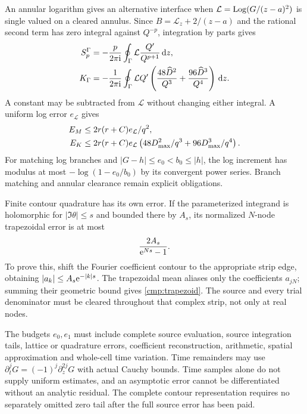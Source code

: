 An annular logarithm gives an alternative interface when
$\mathcal L=\operatorname{Log}(G/(z-a)^2)$ is single valued on a cleared annulus.
Since $B=\mathcal L_z+2/(z-a)$ and the rational second term has zero
integral against $Q^{-p}$, integration by parts gives
\begin{align}
 S_p^\Gamma&=-\frac{p}{2\pi\mathrm i}\oint_\Gamma
                  \mathcal L\frac{Q'}{Q^{p+1}}\,\mathrm d z,\notag\\
 K_\Gamma&=-\frac1{2\pi\mathrm i}\oint_\Gamma\mathcal L Q'
              \left(\frac{48\widehat D^2}{Q^3}
                    +\frac{96\widehat D^3}{Q^4}\right)\,\mathrm d z.
 \label{cmp:log-kernel}
\end{align}
A constant may be subtracted from $\mathcal L$ without changing either
integral. A uniform log error $e_{\mathcal L}$ gives
\begin{align}
 E_M&\le 2r(r+C)e_{\mathcal L}/q^2,\notag\\
 E_K&\le 2r(r+C)e_{\mathcal L}
        \left(48D_{\max}^2/q^3+96D_{\max}^3/q^4\right).
 \label{cmp:log-errors}
\end{align}
For matching log branches and $|G-h|\le e_0<b_0\le|h|$, the log increment
has modulus at most $-\log(1-e_0/b_0)$ by its convergent power series.
Branch matching and annular clearance remain explicit obligations.

Finite contour quadrature has its own error. If the parameterized
integrand is holomorphic for $|\Im\theta|\le s$ and bounded there by
$A_s$, its normalized $N$-node trapezoidal error is at most
\begin{equation}
 \frac{2A_s}{\mathrm e^{Ns}-1}.
 \label{cmp:trapezoid}
\end{equation}
To prove this, shift the Fourier coefficient contour to the appropriate
strip edge, obtaining $|a_k|\le A_s\mathrm e^{-|k|s}$. The trapezoidal mean
aliases only the coefficients $a_{jN}$; summing their geometric bound
gives \eqref{cmp:trapezoid}. The source and every trial denominator must
be cleared throughout that complex strip, not only at real nodes.

The budgets $e_0,e_1$ must include complete source evaluation, source
integration tails, lattice or quadrature errors, coefficient reconstruction,
arithmetic, spatial approximation and whole-cell time variation. Time
remainders may use $\partial_t^jG=(-1)^j\partial_z^{2j}G$ with actual
Cauchy bounds. Time samples alone do not supply uniform estimates, and
an asymptotic error cannot be differentiated without an analytic residual.
The complete contour representation requires no separately omitted zero
tail after the full source error has been paid.

